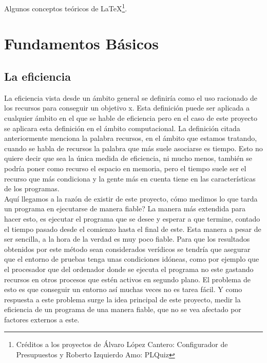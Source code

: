 

Algunos conceptos teóricos de \LaTeX \footnote{Créditos a los proyectos de Álvaro López Cantero: Configurador de Presupuestos y Roberto Izquierdo Amo: PLQuiz}.

\section{Fundamentos Básicos}

\subsection{La eficiencia}

La eficiencia vista desde un ámbito general se definiría como el uso racionado de los recursos para conseguir un objetivo x. Esta definición puede ser aplicada a cualquier ámbito en el que se hable de eficiencia pero en el caso de este proyecto se aplicara esta definición en el ámbito computacional.
La definición citada anteriormente menciona la palabra recursos, en el ámbito que estamos tratando, cuando se habla de recursos la palabra que más suele asociarse es tiempo. Esto no quiere decir que sea la única medida de eficiencia, ni mucho menos, también se podría poner como recurso el espacio en memoria, pero el tiempo suele ser el recurso que más condiciona y la gente más en cuenta tiene en las características de los  programas.\\

Aquí llegamos a la razón de existir de este proyecto, cómo medimos lo que tarda un programa en ejecutarse de manera fiable? La manera más extendida para hacer esto, es ejecutar el programa que se desee y esperar a que termine, contado el tiempo pasado desde el comienzo hasta el final de este. Esta manera a pesar de ser sencilla, a la hora de la verdad es muy poco fiable. Para que los resultados obtenidos por este método sean considerados verídicos se tendría que asegurar que el entorno de pruebas tenga unas condiciones idóneas, como por ejemplo que el procesador que del ordenador donde se ejecuta el programa no este gastando recursos en otros procesos que estén activos en segundo plano. El problema de esto es que conseguir un entorno así muchas veces no es tarea fácil. Y como respuesta a este problema surge la idea principal de este proyecto, medir la eficiencia de un programa de una manera fiable, que no se vea afectado por factores externos a este.\\

